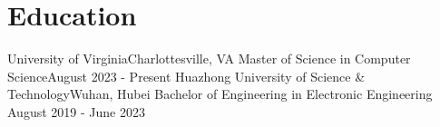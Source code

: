 \section{Education}
  \resumeSubHeadingListStart
    
    \resumeSubheading
      {University of Virginia}{Charlottesville, VA}
      {Master of Science in Computer Science}{August 2023 - Present}
        \resumeItemListStart
        \resumeItemListEnd
    \resumeSubheading
      {Huazhong University of Science \& Technology}{Wuhan, Hubei}
      {Bachelor of Engineering in Electronic Engineering }{August 2019 - June 2023}
        \resumeItemListStart
        \resumeItemListEnd
  \resumeSubHeadingListEnd